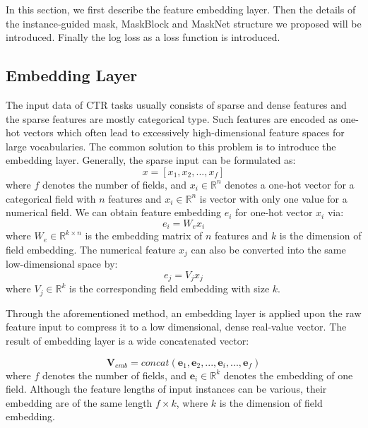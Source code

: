 \documentclass[sigconf]{acmart}
\begin{document}
In this section, we first describe the feature embedding layer. Then the details of the instance-guided mask, MaskBlock and MaskNet structure we proposed will be introduced. Finally the log loss as a loss function is introduced.



\subsection{Embedding Layer}
The input data of CTR tasks usually consists of sparse and dense features and the sparse features are mostly categorical type. Such features are  encoded as one-hot vectors which often lead to excessively high-dimensional feature spaces for large vocabularies. The common solution to this problem is to introduce the embedding layer. Generally, the sparse input can be formulated as:
\begin{equation}
  x = [x_1, x_2, ..., x_f]
\end{equation}
where $f$ denotes the number of fields, and $x_i \in \mathbb{R}^n$ denotes a one-hot vector for a categorical  field with $n$ features and $x_i \in \mathbb{R}^n$ is vector with only one value for a numerical  field. We can obtain feature embedding $e_i$ for one-hot vector $x_i$ via:
\begin{equation}
  e_i = W_ex_i
\end{equation}
where $W_e \in \mathbb{R}^{k\times n}$ is the embedding matrix of $n$ features and $k$ is the dimension of field embedding. The numerical feature $x_j$ can also be converted into the same low-dimensional space by:
\begin{equation}
  e_j = V_jx_j
\end{equation}
where $V_j \in \mathbb{R}^k$ is the corresponding field embedding with size $k$.


Through the aforementioned method, an embedding layer is applied upon the raw feature input to compress it to a low dimensional, dense real-value vector. The result of embedding layer is a wide concatenated vector:

\begin{equation}
  \mathbf{V}_{emb} = concat(\mathbf{e}_1, \mathbf{e}_2, ..., \mathbf{e}_i, ..., \mathbf{e}_f)
\end{equation}
where $f$ denotes the number of fields, and  $\mathbf{e}_i \in \mathbb{R}^k$ denotes the embedding of one field. Although the feature lengths of input instances can be various, their embedding are of the same length $f \times k$, where $k$ is the dimension of field embedding.
\end{document}
